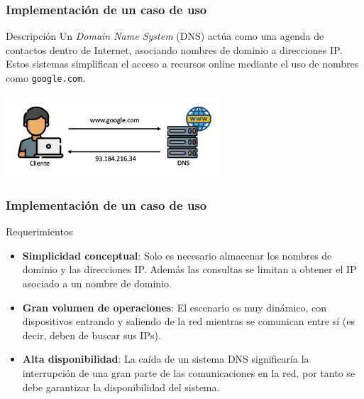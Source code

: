\begin{frame}
    \frametitle{Implementación de un caso de uso}

    
    \begin{block}{Descripción}
    Un \textit{Domain Name System} (DNS) actúa como una agenda de contactos dentro de Internet, asociando nombres de dominio a direcciones IP. Estos sistemas simplifican el acceso a recursos online mediante el uso de nombres como \texttt{google.com}. 

    \end{block}

    \begin{center}
        
        \includegraphics[width=0.6\textwidth]{img/dns.png}
    \end{center}
\end{frame}


\begin{frame}
    \frametitle{Implementación de un caso de uso}

    \begin{block}{Requerimientos}
        \begin{itemize}
            \item \textbf{Simplicidad conceptual}: Solo es necesario almacenar los nombres de dominio y las direcciones IP. Además las consultas se limitan a obtener el IP asociado a un nombre de dominio.
            \item \textbf{Gran volumen de operaciones}: El escenario es muy dinámico, con dispositivos entrando y saliendo de la red mientras se comunican entre sí (es decir, deben de buscar sus IPs).
            \item \textbf{Alta disponibilidad}: La caída de un sistema DNS significaría la interrupción de una gran parte de las comunicaciones en la red, por tanto se debe garantizar la disponibilidad del sistema.
        \end{itemize}

    \end{block}

\end{frame}



